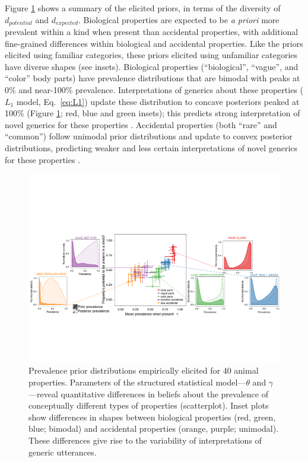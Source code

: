 \documentclass[12pt,letterpaper]{article}
\begin{document}
Figure \ref{fig:prior2} shows a summary of the elicited priors, in terms of the diversity of $d_{potential}$ and $d_{expected}$.
Biological properties are expected to be \emph{a priori} more prevalent within a kind when present than accidental properties, with additional fine-grained differences within biological and accidental properties.
Like the priors elicited using familiar categories, these priors elicited using unfamiliar categories have diverse shapes (see insets). 
Biological properties (``biological'', ``vague'', and ``color'' body parts) have prevalence distributions that are bimodal with peaks at 0\% and near-100\% prevalence. 
Interpretations of generics about these properties ($L_1$ model, Eq.~\ref{eq:L1}) update these distribution to concave posteriors peaked at 100\% (Figure \ref{fig:prior2}; red, blue and green insets); this predicts strong interpretation of novel generics for these properties \cite{Gelman2002}.
Accidental properties (both ``rare'' and ``common'') follow unimodal prior distributions and update to convex posterior distributions, predicting weaker and less certain interpretations of novel generics for these properties \cite{Cimpian2010c}. 


\begin{figure}
\centering
    \includegraphics[width=\columnwidth]{prevalence-asymmetry-scatterwDists-byItem3.pdf}
    \caption{Prevalence prior distributions empirically elicited for 40 animal properties.
    Parameters of the structured statistical model---$\theta$ and $\gamma$---reveal quantitative differences in beliefs about the prevalence of conceptually different types of properties (scatterplot). 
    Inset plots show differences in shapes between biological properties (red, green, blue; bimodal) and accidental properties (orange, purple; unimodal).   
  These differences give rise to the variability of interpretations of generic utterances. 
  }
  \label{fig:prior2}
\end{figure}
\end{document}

